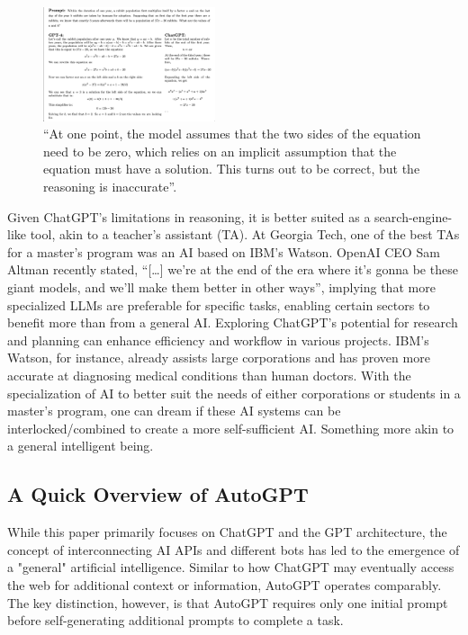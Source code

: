 \documentclass[letterpaper, 10pt, conference]{ieeeconf}
\begin{document}
   \begin{figure}
       \centering
       \includegraphics[width=0.45\textwidth]{images/math_explanation.png}
       \caption{\enquote{At one point, the model assumes that the two sides of the equation need to be zero, which relies on an implicit assumption
       that the equation must have a solution. This turns out to be correct, but the reasoning is inaccurate}\cite{bubeck2023sparks}.}       
       \label{fig:image1}
   \end{figure}
   
        Given ChatGPT's limitations in reasoning, it is better suited as a search-engine-like tool, akin to a teacher's assistant (TA). At Georgia Tech, one of the best TAs for a master's program was an AI based on IBM's Watson\cite{popenici2017}. OpenAI CEO Sam Altman recently stated, 
        \enquote{[…] we're at the end of the era where it's gonna be these giant models, and we'll make them better in other ways}\cite{miller2023}, implying that more specialized LLMs are preferable for specific tasks, enabling certain sectors to benefit more than from a general AI. Exploring ChatGPT's potential for research and planning can enhance efficiency and workflow in various projects. IBM's Watson, for instance, already assists large corporations and has proven more accurate at diagnosing medical conditions than human doctors\cite{popenici2017}. 
        With the specialization of AI to better suit the needs of either corporations or students in a master's program, one can dream if these AI systems can be interlocked/combined to create a more self-sufficient AI. Something more akin to a general intelligent being.

    \subsection{A Quick Overview of AutoGPT}
        While this paper primarily focuses on ChatGPT and the GPT architecture, the concept of interconnecting AI APIs and different bots has led to the emergence of a "general" artificial intelligence. Similar to how ChatGPT may eventually access the web for additional context or information, AutoGPT operates comparably. The key distinction, however, is that AutoGPT requires only one initial prompt before self-generating additional prompts to complete a task\cite{matt2023}.
\end{document}
